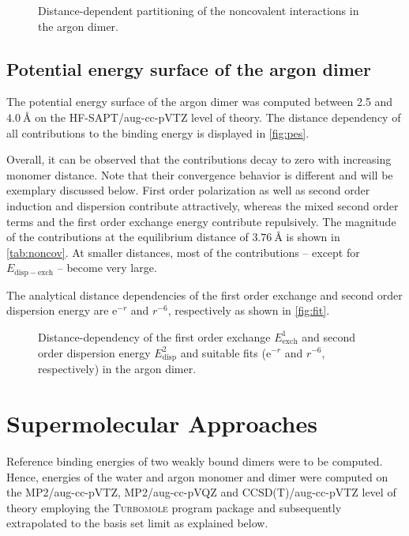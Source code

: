 \documentclass[a4paper,12pt, parskip=half]{scrartcl}
\newcommand{\m}[1]{\mathrm{#1}}
\begin{document}
\begin{figure}
	\centering
	
	\vspace{-20pt}
	\caption{Distance-dependent partitioning of the noncovalent interactions in the argon dimer.}
	\label{fig:pes}
\end{figure}



\subsection{Potential energy surface of the argon dimer}
%
The potential energy surface of the argon dimer was computed between 2.5 and $ \SI{4.0}{\angstrom} $ on the HF-SAPT/aug-cc-pVTZ level of theory. The distance dependency of all contributions to the binding energy is displayed in \autoref{fig:pes}.

Overall, it can be observed that the contributions decay to zero with increasing monomer distance. Note that their convergence behavior is different and will be exemplary discussed below. First order polarization as well as second order induction and dispersion contribute attractively, whereas the mixed second order terms and the first order exchange energy contribute repulsively. The magnitude of the contributions at the equilibrium distance of $ \SI{3.76}{\angstrom} $ is shown in \autoref{tab:noncov}. At smaller distances, most of the contributions -- except for $E_\m{disp-exch} $ -- become very large.

The analytical distance dependencies of the first order exchange and second order dispersion energy are $ \m{e}^{-r} $ and $ r^{-6} $, respectively as shown in \autoref{fig:fit}.

\begin{figure}[H]
	\centering
	
	\vspace{-20pt}
	\caption{Distance-dependency of the first order exchange $ E^1_\m{exch} $ and second order dispersion energy $ E^2_\m{disp} $ and suitable fits ($ \m{e}^{-r} $ and $ r^{-6} $, respectively) in the argon dimer.}
	\label{fig:fit}
\end{figure}
%
\section{Supermolecular Approaches}
%
Reference binding energies of two weakly bound dimers were to be computed. Hence, energies of the water and argon monomer and dimer were computed on the MP2/aug-cc-pVTZ, MP2/aug-cc-pVQZ and CCSD(T)/aug-cc-pVTZ level of theory employing the \textsc{Turbomole}\autocite[]{turbomole1,turbomole2} program package and subsequently extrapolated to the basis set limit as explained below.
\end{document}
